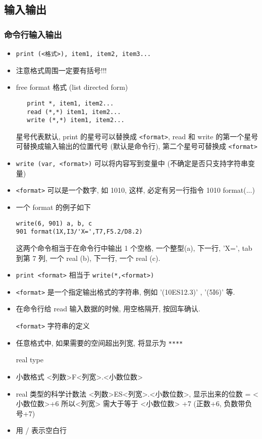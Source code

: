\subsection{输入输出}

\subsubsection{命令行输入输出}
\begin{itemize}
\item \verb`print (<格式>), item1, item2, item3...`
\item 注意格式周围一定要有括号!!!
\item free format 格式 (list directed form)
\begin{lstlisting}
   print *, item1, item2...
   read (*,*) item1, item2... 
   write (*,*) item1, item2...
\end{lstlisting}
   星号代表默认, print 的星号可以替换成 \verb`<format>`, read 和 write 的第一个星号可替换成输入输出的位置代号 (默认是命令行), 第二个星号可替换成 \verb`<format>`
\item \verb`write (var, <format>)` 可以将内容写到变量中 (不确定是否只支持字符串变量)
\item \verb`<format>` 可以是一个数字, 如 1010, 这样, 必定有另一行指令 1010 format(...)
\item 一个 format 的例子如下
\begin{lstlisting}
write(6, 901) a, b, c
901 format(1X,I3/'X=',T7,F5.2/D8.2)
\end{lstlisting}
这两个命令相当于在命令行中输出 1 个空格, 一个整型(a), 下一行, 'X=', tab 到第 7 列, 一个 real (b), 下一行, 一个 real (c).
\item \verb`print <format>` 相当于 \verb`write(*,<format>)`
\item \verb`<format>` 是一个指定输出格式的字符串, 例如 '(10ES12.3)' , '(5I6)' 等.
\item 在命令行给 read 输入数据的时候, 用空格隔开, 按回车确认.

\verb`<format>` 字符串的定义
\item 任意格式中, 如果需要的空间超出列宽, 将显示为 \verb`****`

real type
\item 小数格式 <列数>F<列宽>.<小数位数>
\item real 类型的科学计数法  <列数>ES<列宽>.<小数位数>, 显示出来的位数 = <小数位数>+6
  所以<列宽> 需大于等于 <小数位数> +7 (正数+6, 负数带负号+7)
\item 用 / 表示空白行


\end{itemize}
